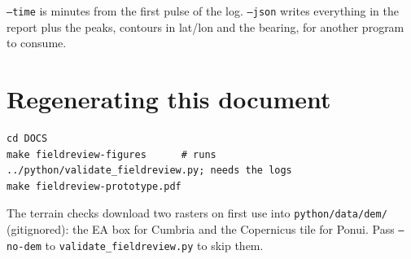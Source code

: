 \documentclass[11pt,a4paper]{article}
\newcommand{\code}[1]{\texttt{\small #1}}
\begin{document}
\code{--time} is minutes from the first pulse of the log. \code{--json} writes everything
in the report plus the peaks, contours in lat/lon and the bearing, for another program to
consume.

\section{Regenerating this document}

\begin{lstlisting}
cd DOCS
make fieldreview-figures      # runs ../python/validate_fieldreview.py; needs the logs
make fieldreview-prototype.pdf
\end{lstlisting}

The terrain checks download two rasters on first use into \code{python/data/dem/}
(gitignored): the EA box for Cumbria and the Copernicus tile for Ponui. Pass
\code{--no-dem} to \code{validate\_fieldreview.py} to skip them.
\end{document}

